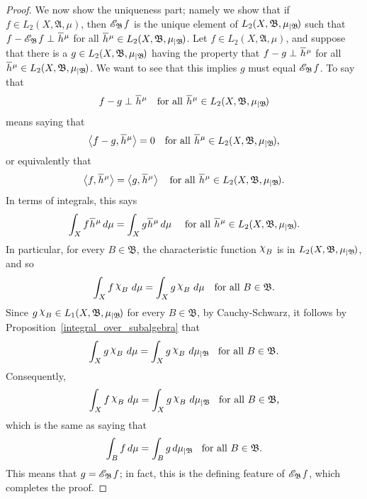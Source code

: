 \documentclass[
twoside=true,
paper=letter,
fontsize=9pt,
pagesize=auto,
leqno,
openany,
headsepline,
overfullrule,
]{scrbook}
\theoremstyle{plain}
\theoremstyle{plain}
\theoremstyle{definition}
\theoremstyle{bfnoteitalic}
\theoremstyle{bfnoteroman}
\newcommand{\sigalg}[1]{\mathfrak{#1}}
\newcommand{\cali}[1]{\mathscr{#1}}
\newcommand{\condexpsub}[2]
{\mathop{\cali{E}\hspace{-1.5pt}}\nolimits_{#2}\hspace{-1pt}#1}
\newcommand{\charfunction}[1]{\mathop{{\raisebox{2pt}{$\chi$}}_{#1}}}
\newcommand{\restrictedto}[1]{_{\lvert#1}\kern-1.5pt}
\newcommand{\sigmaalgebra}{\sigalg{A}}
\newcommand{\sigmaalgebraii}{\sigalg{B}}
\newcommand{\funch}{h}
\newcommand{\function}{f}
\newcommand{\functionii}{g}
\newcommand{\measurespace}{X}
\newcommand{\measure}{\mu}
\newcommand{\measmu}{\mu}
\newcommand*\xbar[1]{%
   \hbox{%
     \vbox{%
       \hrule height 0.4pt %
       \kern0.4ex%
       \hbox{%
         \ensuremath{#1}%
       }%
     }%
   }%
}
\newcommand{\lebclass}[1]{\hspace{.5pt}\xbar{#1}\hspace{0.5pt}}
\newcommand{\ellclass}[2]{\lebclass{#1}^{#2}}
\begin{document}
\begin{proof}
We now show the uniqueness part; namely we show that if
$\function\in L_2(\measurespace, \sigmaalgebra,\measure)$, then
$\condexpsub{\function}{\sigmaalgebraii}$ is the
unique element of
$L_2(\measurespace, \sigmaalgebraii,\measure\restrictedto{\sigmaalgebraii})$
such that
$\function - \condexpsub{\function}{\sigmaalgebraii} \perp \ellclass{\funch}{\measmu}$ for all $\ellclass{\funch}{\measmu}\in
L_2(\measurespace, \sigmaalgebraii,\measure\restrictedto{\sigmaalgebraii})$.
Let
$\function\in L_2(\measurespace, \sigmaalgebra,\measure)$,
and suppose that there is a
$\functionii \in L_2(\measurespace, \sigmaalgebraii,\measure\restrictedto{\sigmaalgebraii})$
having the property that
$\function-\functionii\perp \ellclass{\funch}{\measmu}$ for all $\ellclass{\funch}{\measmu}\in
L_2(\measurespace, \sigmaalgebraii,\measure\restrictedto{\sigmaalgebraii})$.
We want to see that this implies $\functionii$ must equal
$\condexpsub{\function}{\sigmaalgebraii}$.
To say that
\[
\function-\functionii\perp \ellclass{\funch}{\measmu}
\quad\text{for all $\ellclass{\funch}{\measmu}\in
L_2(\measurespace, \sigmaalgebraii,\measure\restrictedto{\sigmaalgebraii})$}
\]
means saying that
\[
\inner{\function-\functionii}{\ellclass{\funch}{\measmu}} = 0
\quad\text{for all
$\ellclass{\funch}{\measmu}\in L_2(\measurespace, \sigmaalgebraii,\measure\restrictedto{\sigmaalgebraii})$},
\]
or equivalently that
\[
\inner{\function}{\ellclass{\funch}{\measmu}} = \inner{\functionii}{\ellclass{\funch}{\measmu}}
\quad\text{for all
$\ellclass{\funch}{\measmu}\in L_2(\measurespace, \sigmaalgebraii,\measure\restrictedto{\sigmaalgebraii})$}.
\]
In terms of integrals, this says
\[
\int_\measurespace \function\ellclass{\funch}{\measmu} \, d\measure
=
\int_\measurespace \functionii\ellclass{\funch}{\measmu} \, d\measure
\quad\text{
for all
$\ellclass{\funch}{\measmu}\in L_2(\measurespace, \sigmaalgebraii,\measure\restrictedto{\sigmaalgebraii})$}.
\]
In particular, for every $B\in\sigmaalgebraii$, the characteristic function
$\charfunction{B}$ is in
$L_2(\measurespace, \sigmaalgebraii,\measure\restrictedto{\sigmaalgebraii})$, and so
\[
\int_\measurespace \function\charfunction{B} \, d\measure
=
\int_\measurespace \functionii\charfunction{B} \, d\measure
\quad\text{for all
$B\in\sigmaalgebraii$}.
\]
Since
$\functionii\charfunction{B}
\in L_1(\measurespace, \sigmaalgebraii,\measure\restrictedto{\sigmaalgebraii})$
for every $B\in\sigmaalgebraii$, by Cauchy-Schwarz,
it follows by Proposition~\ref{integral_over_subalgebra} that
\[
\int_\measurespace \functionii\charfunction{B}\, d\measure
=
\int_\measurespace \functionii\charfunction{B}\, d\measure\restrictedto{\sigmaalgebraii}
\quad\text{for all
$B\in\sigmaalgebraii$}.
\]
Consequently,
\[
\int_\measurespace \function\charfunction{B} \, d\measure
=
\int_\measurespace \functionii\charfunction{B} \, d\measure\restrictedto{\sigmaalgebraii}
\quad
\text{for all
$B\in\sigmaalgebraii$,}
\]
which is the same as saying that
\[
\int_B \function \, d\measure
=
\int_B \functionii \, d\measure\restrictedto{\sigmaalgebraii}
\quad\text{for all $B\in\sigmaalgebraii$.}
\]
This means that $\functionii = \condexpsub{\function}{\sigmaalgebraii}$;  in fact, this is the defining feature of $\condexpsub{\function}{\sigmaalgebraii}$, which completes the proof.
\end{proof}
\end{document}
